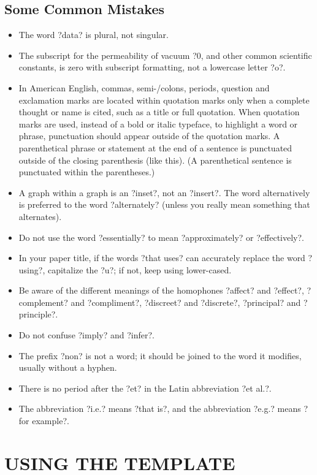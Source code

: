 \documentclass[letterpaper, 10 pt, conference]{ieeeconf}  %
\begin{document}
\subsection{Some Common Mistakes}
\begin{itemize}


\item The word ?data? is plural, not singular.
\item The subscript for the permeability of vacuum ?0, and other common scientific constants, is zero with subscript formatting, not a lowercase letter ?o?.
\item In American English, commas, semi-/colons, periods, question and exclamation marks are located within quotation marks only when a complete thought or name is cited, such as a title or full quotation. When quotation marks are used, instead of a bold or italic typeface, to highlight a word or phrase, punctuation should appear outside of the quotation marks. A parenthetical phrase or statement at the end of a sentence is punctuated outside of the closing parenthesis (like this). (A parenthetical sentence is punctuated within the parentheses.)
\item A graph within a graph is an ?inset?, not an ?insert?. The word alternatively is preferred to the word ?alternately? (unless you really mean something that alternates).
\item Do not use the word ?essentially? to mean ?approximately? or ?effectively?.
\item In your paper title, if the words ?that uses? can accurately replace the word ?using?, capitalize the ?u?; if not, keep using lower-cased.
\item Be aware of the different meanings of the homophones ?affect? and ?effect?, ?complement? and ?compliment?, ?discreet? and ?discrete?, ?principal? and ?principle?.
\item Do not confuse ?imply? and ?infer?.
\item The prefix ?non? is not a word; it should be joined to the word it modifies, usually without a hyphen.
\item There is no period after the ?et? in the Latin abbreviation ?et al.?.
\item The abbreviation ?i.e.? means ?that is?, and the abbreviation ?e.g.? means ?for example?.

\end{itemize}


\section{USING THE TEMPLATE}
\end{document}
